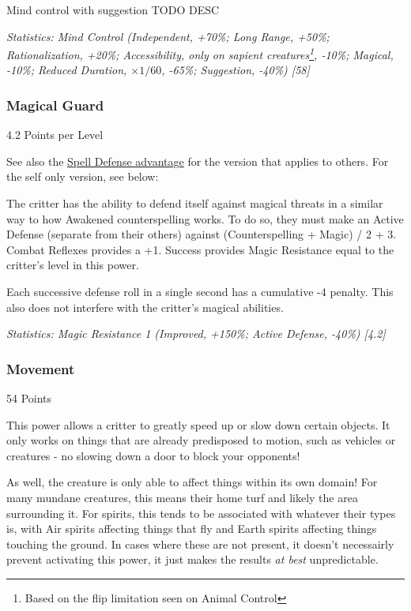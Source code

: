 \begin{multicols*}{3}
	Mind control with suggestion
	TODO DESC
	
	
	\textcolor{OliveGreen}{\textit{Statistics: Mind Control (Independent, +70\%; Long Range, +50\%; Rationalization, +20\%; Accessibility, only on sapient creatures\footnote{Based on the flip limitation seen on Animal Control}, -10\%; Magical, -10\%; Reduced Duration, \(\times1/60\), -65\%; Suggestion, -40\%) [58]}}
	
	\subsubsection{Magical Guard}\label{magical_guard}
	\begin{flushright}
		4.2 Points per Level
	\end{flushright}
	
	See also the \hyperref[spell_defense]{Spell Defense advantage} for  the version that applies to others. For the self only version, see below:
	
	The critter has the ability to defend itself against magical threats in a similar way to how Awakened counterspelling works.  To do so, they must make an Active Defense (separate from their others) against (Counterspelling + Magic) / 2 + 3. Combat Reflexes provides a +1. Success provides Magic Resistance equal to the critter's level in this power.
	
	Each successive defense roll in a single second has a cumulative -4 penalty. This also does not interfere with the critter's magical abilities.
	
	\textcolor{OliveGreen}{\textit{Statistics: Magic Resistance 1 (Improved, +150\%; Active Defense, -40\%) [4.2]}}
	
	\subsubsection{Movement}\label{movement}
	\begin{flushright}
		54 Points
	\end{flushright}
	
	This power allows a critter to greatly speed up or slow down certain objects. It only works on things that are already predisposed to motion, such as vehicles or creatures - no slowing down a door to block your opponents! 
	
	As well, the creature is only able to affect things within its own domain! For many mundane creatures, this means their home turf and likely the area surrounding it. For spirits, this tends to be associated with whatever their types is, with Air spirits affecting things that fly and Earth spirits affecting things touching the ground. In cases where these are not present, it doesn't necessairly prevent activating this power, it just makes the results \textit{at best} unpredictable.
	

\end{multicols*}
